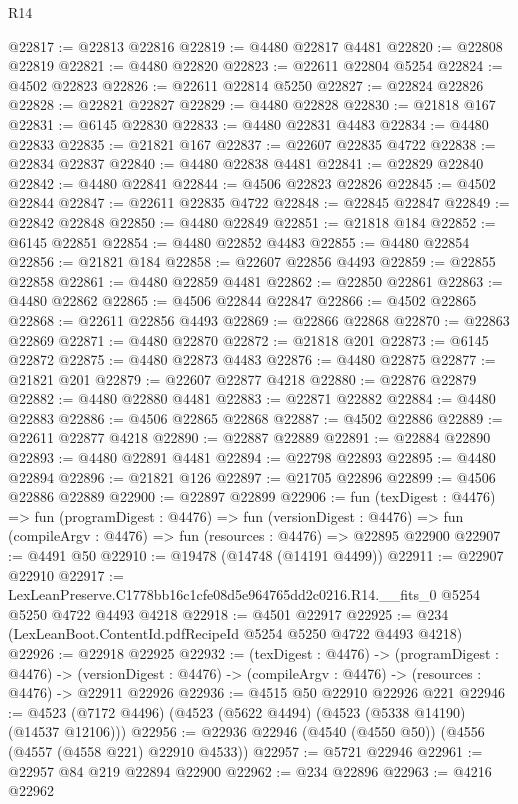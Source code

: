 \begin{lexlean}{R14}
\begin{coremodule}
@22817 := @22813 @22816
@22819 := @4480 @22817 @4481
@22820 := @22808 @22819
@22821 := @4480 @22820
@22823 := @22611 @22804 @5254
@22824 := @4502 @22823
@22826 := @22611 @22814 @5250
@22827 := @22824 @22826
@22828 := @22821 @22827
@22829 := @4480 @22828
@22830 := @21818 @167
@22831 := @6145 @22830
@22833 := @4480 @22831 @4483
@22834 := @4480 @22833
@22835 := @21821 @167
@22837 := @22607 @22835 @4722
@22838 := @22834 @22837
@22840 := @4480 @22838 @4481
@22841 := @22829 @22840
@22842 := @4480 @22841
@22844 := @4506 @22823 @22826
@22845 := @4502 @22844
@22847 := @22611 @22835 @4722
@22848 := @22845 @22847
@22849 := @22842 @22848
@22850 := @4480 @22849
@22851 := @21818 @184
@22852 := @6145 @22851
@22854 := @4480 @22852 @4483
@22855 := @4480 @22854
@22856 := @21821 @184
@22858 := @22607 @22856 @4493
@22859 := @22855 @22858
@22861 := @4480 @22859 @4481
@22862 := @22850 @22861
@22863 := @4480 @22862
@22865 := @4506 @22844 @22847
@22866 := @4502 @22865
@22868 := @22611 @22856 @4493
@22869 := @22866 @22868
@22870 := @22863 @22869
@22871 := @4480 @22870
@22872 := @21818 @201
@22873 := @6145 @22872
@22875 := @4480 @22873 @4483
@22876 := @4480 @22875
@22877 := @21821 @201
@22879 := @22607 @22877 @4218
@22880 := @22876 @22879
@22882 := @4480 @22880 @4481
@22883 := @22871 @22882
@22884 := @4480 @22883
@22886 := @4506 @22865 @22868
@22887 := @4502 @22886
@22889 := @22611 @22877 @4218
@22890 := @22887 @22889
@22891 := @22884 @22890
@22893 := @4480 @22891 @4481
@22894 := @22798 @22893
@22895 := @4480 @22894
@22896 := @21821 @126
@22897 := @21705 @22896
@22899 := @4506 @22886 @22889
@22900 := @22897 @22899
@22906 := fun (texDigest : @4476) =>
  fun (programDigest : @4476) =>
  fun (versionDigest : @4476) =>
  fun (compileArgv : @4476) => fun (resources : @4476) => @22895 @22900
@22907 := @4491 @50
@22910 := @19478 (@14748 (@14191 @4499))
@22911 := @22907 @22910
@22917 := LexLeanPreserve.C1778bb16c1cfe08d5e964765dd2c0216.R14.__fits_0
    @5254
    @5250
    @4722
    @4493
    @4218
@22918 := @4501 @22917
@22925 := @234 (LexLeanBoot.ContentId.pdfRecipeId @5254 @5250 @4722 @4493 @4218)
@22926 := @22918 @22925
@22932 := (texDigest : @4476) ->
  (programDigest : @4476) ->
  (versionDigest : @4476) -> (compileArgv : @4476) -> (resources : @4476) -> @22911 @22926
@22936 := @4515 @50 @22910 @22926 @221
@22946 := @4523 (@7172 @4496) (@4523 (@5622 @4494) (@4523 (@5338 @14190) (@14537 @12106)))
@22956 := @22936 @22946 (@4540 (@4550 @50)) (@4556 (@4557 (@4558 @221) @22910 @4533))
@22957 := @5721 @22946
@22961 := @22957 @84 @219 @22894 @22900
@22962 := @234 @22896
@22963 := @4216 @22962

\end{coremodule}
\end{lexlean}

